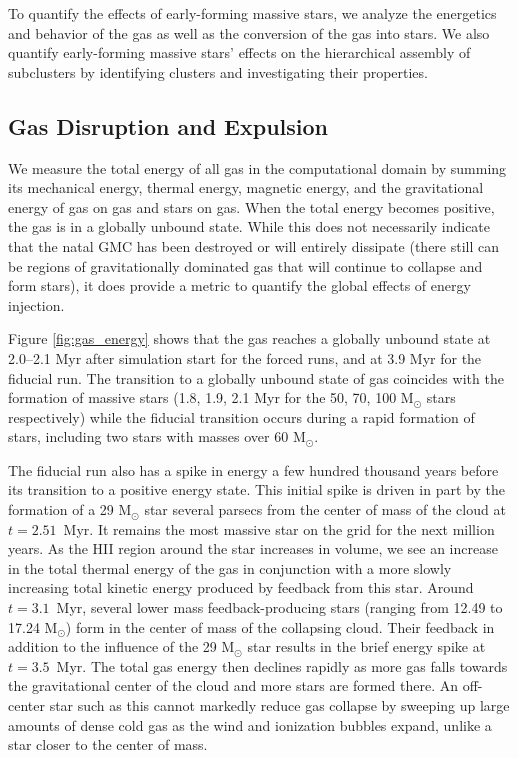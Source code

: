 \documentclass[twoside]{drexel-thesis}
\begin{document}
\begin{thesis}
To quantify the effects of early-forming massive stars, we analyze the energetics and behavior of the gas as well as the conversion of the gas into stars. We also quantify early-forming massive stars' effects on the hierarchical assembly of subclusters by identifying clusters and investigating their properties.

\subsection{Gas Disruption and Expulsion} \label{subsec:expulsion}

We measure the total energy of all gas in the computational domain by summing its mechanical energy, thermal energy, magnetic energy, and the gravitational energy of gas on gas and stars on gas. When the total energy becomes positive, the gas is in a globally unbound state. While this does not necessarily indicate that the natal GMC has been destroyed or will entirely dissipate (there still can be regions of gravitationally dominated gas that will continue to collapse and form stars), it does provide a metric to quantify the global effects of energy injection. 

Figure \ref{fig:gas_energy} shows that the gas reaches a globally unbound state at 2.0--2.1 Myr after simulation start for the forced runs, and at 3.9 Myr for the fiducial run. The transition to a globally unbound state of gas coincides with the formation of massive stars (1.8, 1.9, 2.1 Myr for the 50, 70, 100 M$_{\odot}$ stars respectively) while the fiducial transition occurs during a rapid formation of stars, including two stars with masses over 60 M$_{\odot}$. 

The fiducial run also has a spike in energy a few hundred thousand years before its transition to a positive energy state. This initial spike is driven in part by the formation of a 29 M$_{\odot}$ star several parsecs from the center of mass of the cloud at $t=2.51$~Myr. It remains the most massive star on the grid for the next million years. As the HII region around the star increases in volume, we see an increase in the total thermal energy of the gas in conjunction with a more slowly increasing total kinetic energy produced by feedback from this star. Around $t=3.1$~Myr, several lower mass feedback-producing stars (ranging from 12.49 to 17.24 M$_{\odot}$) form in the center of mass of the collapsing cloud. Their feedback in addition to the influence of the 29 M$_{\odot}$ star results in the brief energy spike at $t=3.5$~Myr.
The total gas energy then declines rapidly as more gas falls towards the gravitational center of the cloud and more stars are formed there. An off-center star such as this cannot markedly reduce gas collapse by sweeping up large amounts of dense cold gas as the wind and ionization bubbles expand, unlike a star closer to the center of mass. 


\end{thesis}
\end{document}
